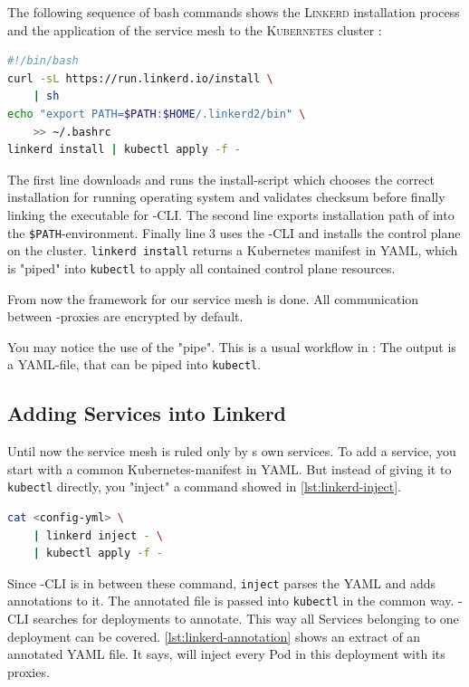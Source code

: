 The following sequence of bash commands shows the \textsc{Linkerd} installation process and the application of the service mesh to the \textsc{Kubernetes} cluster \cite{linkerd-get-started}:
\begin{lstlisting}[language=bash,caption={Setup of \textsc{Linkerd}}, label={lst:linkerd-setup}]
#!/bin/bash
curl -sL https://run.linkerd.io/install \
	| sh
echo "export PATH=$PATH:$HOME/.linkerd2/bin" \
	>> ~/.bashrc
linkerd install | kubectl apply -f -
\end{lstlisting}
The first line downloads and runs the install-script which chooses the correct installation for running operating system and validates checksum before finally linking the executable for \linkerd{}-CLI.
The second line exports installation path of \linkerd{} into the \lstinline|$PATH|-environment. 
Finally line 3 uses the \linkerd{}-CLI and installs the control plane on the cluster.
\lstinline|linkerd install| returns a Kubernetes manifest in YAML, which is "piped" into \lstinline|kubectl| to apply all contained control plane resources.

From now the framework for our service mesh is done.
All communication between \linkerd{}-proxies are encrypted by default.

You may notice the use of the "pipe". 
This is a usual workflow in \linkerd{}: The output is a YAML-file, that can be piped into \lstinline|kubectl|.

\subsection{Adding Services into Linkerd}
Until now the service mesh is ruled only by \linkerd{}s own services.
To add a service, you start with a common Kubernetes-manifest in YAML.
But instead of giving it to \lstinline|kubectl| directly, you "inject" a \linkerd{} command showed in \autoref{lst:linkerd-inject}.
\begin{lstlisting}[language=bash,caption={Inject \textsc{Linkerd}-annotation into manifest.}, label={lst:linkerd-inject}]
cat <config-yml> \
	| linkerd inject - \
	| kubectl apply -f -
\end{lstlisting}
Since \linkerd{}-CLI is in between these command, \lstinline|inject| parses the YAML and adds annotations to it.
The annotated file is passed into \lstinline|kubectl| in the common way.
\linkerd{}-CLI searches for deployments to annotate.
This way all Services belonging to one deployment can be covered.
\autoref{lst:linkerd-annotation} shows an extract of an annotated YAML file.
It says, \linkerd{} will inject every Pod in this deployment with its proxies.

